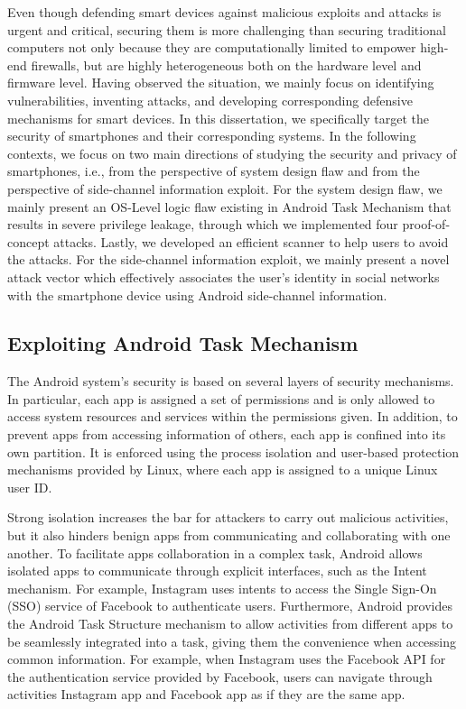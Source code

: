 \documentclass[letterpaper,12pt]{article}
\begin{document}
Even though defending smart devices against malicious exploits and attacks is urgent and critical, securing them is more challenging than securing traditional computers not only because they are computationally limited to empower high-end firewalls, but are highly heterogeneous both on the hardware level and firmware level. Having observed the situation,  we mainly focus on identifying vulnerabilities, inventing attacks, and developing corresponding defensive mechanisms for smart devices. In this dissertation, we specifically target the security of smartphones and their corresponding systems. In the following contexts, we focus on two main directions of studying the security and privacy of smartphones, i.e., from the perspective of system design flaw and from the perspective of side-channel information exploit. For the system design flaw, we mainly present an OS-Level logic flaw existing in Android Task Mechanism that results in severe privilege leakage, through which we implemented four proof-of-concept attacks. Lastly, we developed an efficient scanner to help users to avoid the attacks. For the side-channel information exploit, we mainly present a novel attack vector which effectively associates the user's identity in social networks with the smartphone device using Android side-channel information. 

\subsection{Exploiting Android Task Mechanism}
The Android system's security is based on several layers of security
mechanisms. In particular, each app is assigned a set of permissions and is only allowed to access system resources and services within the
permissions given. In addition, to prevent apps from accessing
information of others, each app is confined into its own partition.
It is enforced using the process isolation and user-based protection
mechanisms provided by Linux, where each app is assigned to a unique
Linux user ID.

Strong isolation increases the bar for attackers to carry out
malicious activities, but it also hinders benign apps from
communicating and collaborating with one another. To facilitate apps
collaboration in a complex task, Android allows isolated apps to
communicate through explicit interfaces, such as the Intent
mechanism. For example, Instagram uses intents to access the Single
Sign-On (SSO) service of Facebook to authenticate users.  Furthermore,
Android provides the Android Task Structure mechanism to allow activities
from different apps to be seamlessly integrated into a task, giving
them the convenience when accessing common information. For example,
when Instagram uses the Facebook API for the authentication service
provided by Facebook, users can navigate through activities Instagram
app and Facebook app as if they are the same app.
\end{document}
